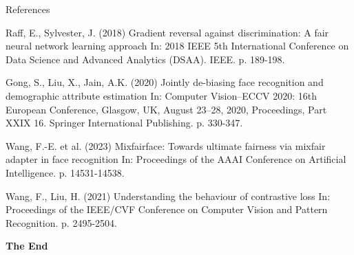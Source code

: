 \documentclass[aspectratio=169,xcolor=dvipsnames]{beamer}
\begin{document}
\begin{frame}{References}
    \footnotesize{
        \begin{thebibliography}{99}
             Raff, E., Sylvester, J. (2018)
            \newblock Gradient reversal against discrimination: A fair neural network learning approach
            \newblock In: 2018 IEEE 5th International Conference on Data Science and Advanced Analytics (DSAA). IEEE. p. 189-198.
            
             Gong, S., Liu, X., Jain, A.K. (2020)
            \newblock Jointly de-biasing face recognition and demographic attribute estimation
            \newblock In: Computer Vision–ECCV 2020: 16th European Conference, Glasgow, UK, August 23–28, 2020, Proceedings, Part XXIX 16. Springer International Publishing. p. 330-347.
            
             Wang, F.-E. et al. (2023)
            \newblock Mixfairface: Towards ultimate fairness via mixfair adapter in face recognition
            \newblock In: Proceedings of the AAAI Conference on Artificial Intelligence. p. 14531-14538.
            
             Wang, F., Liu, H. (2021)
            \newblock Understanding the behaviour of contrastive loss
            \newblock In: Proceedings of the IEEE/CVF Conference on Computer Vision and Pattern Recognition. p. 2495-2504.
        \end{thebibliography}
    }
\end{frame}


\begin{frame}
    \Huge{\centerline{\textbf{The End}}}
\end{frame}

\end{document}
